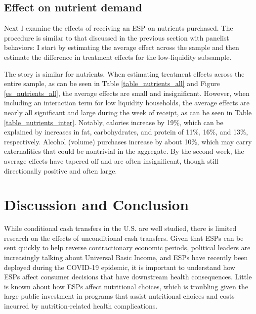 \documentclass[12pt]{article}
\begin{document}
\subsection{Effect on nutrient demand}

Next I examine the effects of receiving an ESP on nutrients purchased.
The procedure is similar to that discussed in the previous section with panelist behaviors: I start by estimating the average effect across the sample and then estimate the difference in treatment effects for the low-liquidity subsample.

The story is similar for nutrients.
When estimating treatment effects across the entire sample, as can be seen in Table \ref{table_nutrients_all} and Figure \ref{es_nutrients_all}, the average effects are small and insignificant.
However, when including an interaction term for low liquidity households, the average effects are nearly all significant and large during the week of receipt, as can be seen in Table \ref{table_nutrients_inter}.
Notably, calories increase by 19\%, which can be explained by increases in fat, carbohydrates, and protein of 11\%, 16\%, and 13\%, respectively.
Alcohol (volume) purchases increase by about 10\%, which may carry externalities that could be nontrivial in the aggregate.
By the second week, the average effects have tapered off and are often insignificant, though still directionally positive and often large.

\section{Discussion and Conclusion} \label{discussion}

While conditional cash transfers in the U.S. are well studied, there is limited research on the effects of unconditional cash transfers.
Given that ESPs can be sent quickly to help reverse contractionary economic periods, political leaders are increasingly talking about Universal Basic Income, and ESPs have recently been deployed during the COVID-19 epidemic, it is important to understand how ESPs affect consumer decisions that have downstream health consequences.
Little is known about how ESPs affect nutritional choices, which is troubling given the large public investment in programs that assist nutritional choices and costs incurred by nutrition-related health complications.
\end{document}
